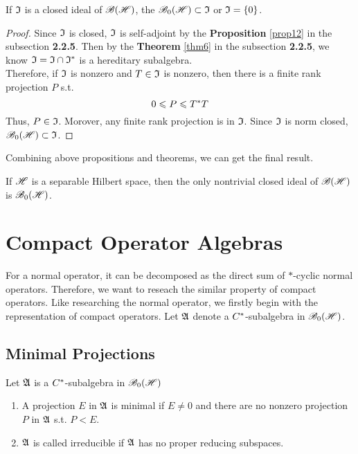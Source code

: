 \begin{prop}
	If $\mathfrak{I}$ is a closed ideal of $\mathscr{B(H)}$, the $\mathscr{B}_{0}\mathscr{(H)} \subset \mathfrak{I}$ or $\mathfrak{I} = \{0\}$.
\end{prop}
\begin{proof}
	Since $\mathfrak{I}$ is closed, $\mathfrak{I}$ is self-adjoint by the  \textbf{Proposition} \ref{prop12} in the subsection \textbf{2.2.5}. Then by the \textbf{Theorem} \ref{thm6} in the subsection \textbf{2.2.5}, we know $\mathfrak{I} = \mathfrak{I} \cap \mathfrak{I}^{*}$ is a hereditary subalgebra. \\
	Therefore, if $\mathfrak{I}$ is nonzero and $T \in \mathfrak{I}$ is nonzero, then there is a finite rank projection $P$ s.t.
	\begin{equation*}
		0 \leqslant P \leqslant T^{*}T
	\end{equation*}
	Thus, $P \in \mathfrak{I}$. Morover, any finite rank projection is in $\mathfrak{I}$. Since $\mathfrak{I}$ is norm closed, $\mathscr{B}_{0}\mathscr{(H)} \subset \mathfrak{I}$.
\end{proof}

Combining above propositions and theorems, we can get the final result.
\begin{cor}
	If $\mathscr{H}$ is a separable Hilbert space, then the only nontrivial closed ideal of $\mathscr{B(H)}$ is $\mathscr{B}_{0}\mathscr{(H)}$.
\end{cor}

\section{Compact Operator Algebras}

For a normal operator, it can be decomposed as the direct sum of $*$-cyclic normal operators. Therefore, we want to reseach the similar property of compact operators. Like researching the normal operator, we firstly begin with the representation of compact operators. Let $\mathfrak{A}$ denote a $C^{*}$-subalgebra in $\mathscr{B}_{0}\mathscr{(H)}$.

\subsection{Minimal Projections}

\begin{defn}
	Let $\mathfrak{A}$ is a $C^{*}$-subalgebra in $\mathscr{B}_{0}\mathscr{(H)}$
	\begin{enumerate}[label=\arabic*)]
		\item A projection $E$ in $\mathfrak{A}$ is minimal if $E \neq 0$ and there are no nonzero projection $P$ in $\mathfrak{A}$ s.t. $P < E$.
		\item $\mathfrak{A}$ is called irreducible if $\mathfrak{A}$ has no proper reducing subspaces.
	\end{enumerate}
\end{defn}

